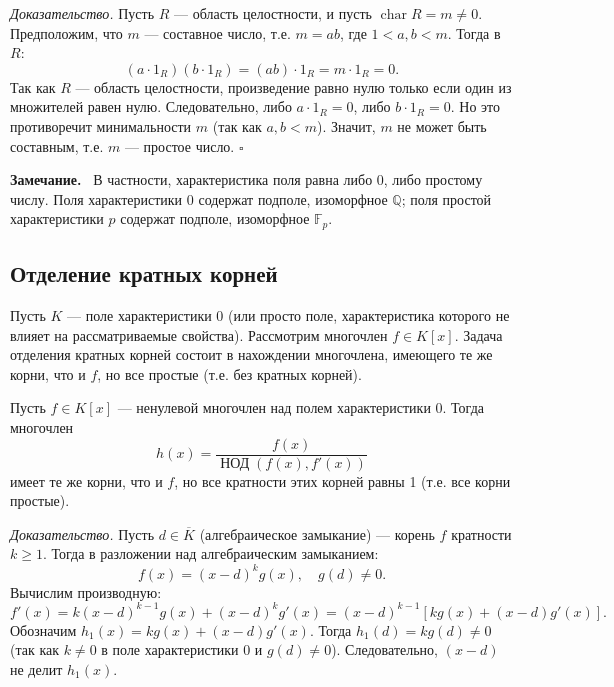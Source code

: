 \documentclass[a4paper,12pt]{article}
\newcommand{\myremark}{\textbf{Замечание.}\ }
\theoremstyle{definition}
\theoremstyle{plain}
\theoremstyle{remark}
\begin{document}
	\medskip
	\textit{Доказательство.}
	Пусть \( R \) — область целостности, и пусть \( \operatorname{char} R = m \neq 0 \). Предположим, что \( m \) — составное число, т.е. \( m = ab \), где \( 1 < a, b < m \). Тогда в \( R \):
	\[
	(a \cdot 1_R)(b \cdot 1_R) = (ab) \cdot 1_R = m \cdot 1_R = 0.
	\]
	Так как \( R \) — область целостности, произведение равно нулю только если один из множителей равен нулю. Следовательно, либо \( a \cdot 1_R = 0 \), либо \( b \cdot 1_R = 0 \). Но это противоречит минимальности \( m \) (так как \( a, b < m \)). Значит, \( m \) не может быть составным, т.е. \( m \) — простое число. \hfill \(\square\)
	
	\myremark
	В частности, характеристика поля равна либо 0, либо простому числу. Поля характеристики 0 содержат подполе, изоморфное \( \mathbb{Q} \); поля простой характеристики \( p \) содержат подполе, изоморфное \( \mathbb{F}_p \).
	
	\subsection{Отделение кратных корней}
	
	Пусть \( K \) — поле характеристики 0 (или просто поле, характеристика которого не влияет на рассматриваемые свойства). Рассмотрим многочлен \( f \in K[x] \). Задача отделения кратных корней состоит в нахождении многочлена, имеющего те же корни, что и \( f \), но все простые (т.е. без кратных корней).
	
	\begin{tcolorbox}[colback=yellow!5, colframe=orange!50!black, title=Теорема (Отделение кратных корней)]
		Пусть \( f \in K[x] \) — ненулевой многочлен над полем характеристики 0. Тогда многочлен
		\[
		h(x) = \frac{f(x)}{\operatorname{НОД}(f(x), f'(x))}
		\]
		имеет те же корни, что и \( f \), но все кратности этих корней равны 1 (т.е. все корни простые).
	\end{tcolorbox}
	
	\medskip
	\textit{Доказательство.}
	Пусть \( d \in \overline{K} \) (алгебраическое замыкание) — корень \( f \) кратности \( k \geq 1 \). Тогда в разложении над алгебраическим замыканием:
	\[
	f(x) = (x - d)^k g(x), \quad g(d) \neq 0.
	\]
	Вычислим производную:
	\[
	f'(x) = k(x - d)^{k-1} g(x) + (x - d)^k g'(x) = (x - d)^{k-1} [k g(x) + (x - d) g'(x)].
	\]
	Обозначим \( h_1(x) = k g(x) + (x - d) g'(x) \). Тогда \( h_1(d) = k g(d) \neq 0 \) (так как \( k \neq 0 \) в поле характеристики 0 и \( g(d) \neq 0 \)). Следовательно, \( (x - d) \) не делит \( h_1(x) \).
	
\end{document}
